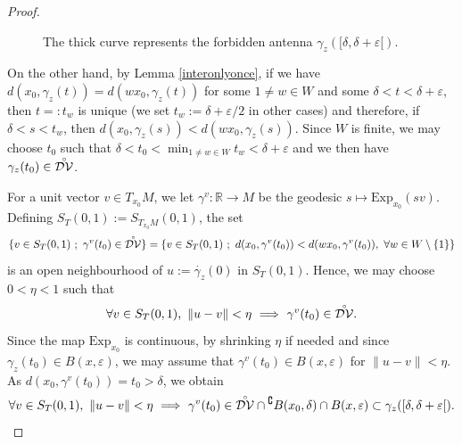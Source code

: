 \documentclass[11pt,twoside]{amsart}
\theoremstyle{plain}
\newcommand{\R}{{\mathbb R}}
\newcommand{\interior}[1]{\accentset{\circ}{#1}}
\begin{document}
\begin{proof}
\begin{figure}
\caption{The thick curve represents the forbidden antenna $\gamma_z([\delta,\delta+\varepsilon[)$.}
\label{no_antenna}
\end{figure}

On the other hand, by Lemma \ref{interonlyonce}, if we have $d(x_0,\gamma_z(t))=d(wx_0,\gamma_z(t))$ for some $1\ne w\in W$ and some $\delta<t<\delta+\varepsilon$, then $t=:t_w$ is unique (we set $t_w:=\delta+\varepsilon/2$ in other cases) and therefore, if $\delta<s<t_w$, then $d(x_0,\gamma_z(s))<d(wx_0,\gamma_z(s))$. Since $W$ is finite, we may choose $t_0$ such that $\delta<t_0<\min_{1\ne w\in W}t_w<\delta+\varepsilon$ and we then have $\gamma_z(t_0)\in\interior{\mathcal{DV}}$.

For a unit vector $v\in T_{x_0}M$, we let $\gamma^v : \R\to M$ be the geodesic $s\mapsto \mathrm{Exp}_{x_0}(sv)$. Defining $S_T(0,1):=S_{T_{x_0}M}(0,1)$, the set
\[\{v\in S_T(0,1)~;~\gamma^v(t_0)\in\interior{\mathcal{DV}}\}=\{v\in S_T(0,1)~;~d(x_0,\gamma^v(t_0))<d(wx_0,\gamma^v(t_0)),~\forall w\in W\setminus\{1\}\}\]
is an open neighbourhood of $u:=\dot{\gamma_z}(0)$ in $S_T(0,1)$. Hence, we may choose $0<\eta<1$ such that
\[\forall v\in S_T(0,1),~\|u-v\|<\eta~\Longrightarrow~\gamma^v(t_0)\in\interior{\mathcal{DV}}.\]
Since the map $\mathrm{Exp}_{x_0}$ is continuous, by shrinking $\eta$ if needed and since $\gamma_z(t_0)\in B(x,\varepsilon)$, we may assume that $\gamma^v(t_0)\in B(x,\varepsilon)$ for $\|u-v\|<\eta$. As $d(x_0,\gamma^v(t_0))=t_0>\delta$, we obtain
\[\forall v\in S_T(0,1),~\|u-v\|<\eta~\Longrightarrow~\gamma^v(t_0)\in \interior{\mathcal{DV}}\cap {}^\complement{B(x_0,\delta)}\cap B(x,\varepsilon)\subset\gamma_z([\delta,\delta+\varepsilon[).\]


\end{proof}
\end{document}
